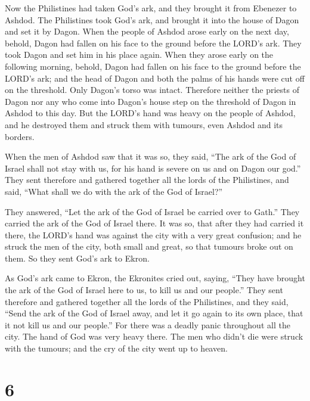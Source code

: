  Now the Philistines had taken God's ark, and they brought
it from Ebenezer to Ashdod.  The Philistines took God's ark,
and brought it into the house of Dagon and set it by Dagon. 
When the people of Ashdod arose early on the next day, behold, Dagon had
fallen on his face to the ground before the LORD's ark. They took Dagon
and set him in his place again.  When they arose early on
the following morning, behold, Dagon had fallen on his face to the
ground before the LORD's ark; and the head of Dagon and both the palms
of his hands were cut off on the threshold. Only Dagon's torso was
intact.  Therefore neither the priests of Dagon nor any who
come into Dagon's house step on the threshold of Dagon in Ashdod to this
day.  But the LORD's hand was heavy on the people of Ashdod,
and he destroyed them and struck them with tumours, even Ashdod and its
borders.

 When the men of Ashdod saw that it was so, they said, ``The
ark of the God of Israel shall not stay with us, for his hand is severe
on us and on Dagon our god.''  They sent therefore and
gathered together all the lords of the Philistines, and said, ``What
shall we do with the ark of the God of Israel?''

They answered, ``Let the ark of the God of Israel be carried over to
Gath.'' They carried the ark of the God of Israel there.  It
was so, that after they had carried it there, the LORD's hand was
against the city with a very great confusion; and he struck the men of
the city, both small and great, so that tumours broke out on them.
 So they sent God's ark to Ekron.

As God's ark came to Ekron, the Ekronites cried out, saying, ``They have
brought the ark of the God of Israel here to us, to kill us and our
people.''  They sent therefore and gathered together all
the lords of the Philistines, and they said, ``Send the ark of the God
of Israel away, and let it go again to its own place, that it not kill
us and our people.'' For there was a deadly panic throughout all the
city. The hand of God was very heavy there.  The men who
didn't die were struck with the tumours; and the cry of the city went up
to heaven.

\hypertarget{section-5}{%
\section{6}\label{section-5}}

